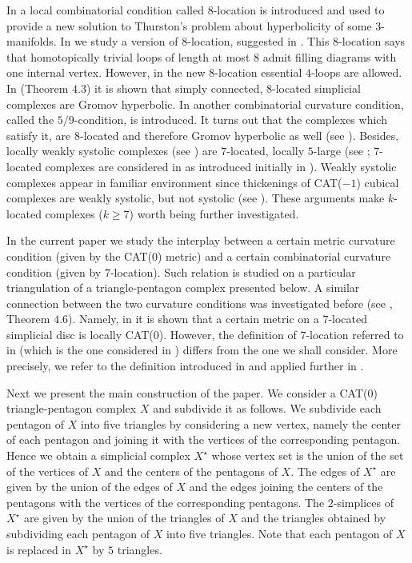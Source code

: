 \documentclass{amsart}
\theoremstyle{definition}
\theoremstyle{remark}
\numberwithin{equation}{section}
\begin{document}
In \cite{O-8loc} a local combinatorial condition called $8$-location is introduced and used to provide a new solution to Thurston's
problem about hyperbolicity of some $3$-manifolds. In \cite{L-8loc} we study a version of $8$-location, suggested in \cite[Subsection 5.1]{O-8loc}.
This $8$-location says that homotopically trivial loops of length at most $8$ admit filling diagrams with one internal vertex.
However, in the new $8$-location essential $4$-loops are allowed.
In \cite{L-8loc} (Theorem $4.3$) it is shown that simply connected,
$8$-located simplicial complexes are Gromov hyperbolic. 
In \cite{L-8loc2} another combinatorial curvature condition, called the $5/9$-condition, is introduced. It turns out that the complexes which satisfy
it, are $8$-located and therefore Gromov hyperbolic as well (see \cite{L-8loc2}). Besides, locally weakly systolic complexes (see \cite{O-sdn}) are $7$-located, locally $5$-large (see \cite{HL}; $7$-located complexes are considered in \cite{HL} as introduced initially in \cite{O-8loc}). Weakly systolic complexes appear in familiar environment since thickenings of CAT($-1$) cubical complexes are weakly systolic, but not
systolic (see \cite{O-sdn}). These arguments make $k$-located complexes ($k \geq 7$) worth being further investigated.

In the current paper we study the interplay between a certain metric curvature condition (given by the CAT(0) metric) and a certain combinatorial curvature condition (given by $7$-location). Such relation is studied on a particular triangulation of a triangle-pentagon complex presented below. A similar connection between the two curvature conditions was investigated before (see \cite{HL}, Theorem $4.6$). Namely, in \cite{HL} it is shown that a certain metric on a $7$-located simplicial disc is locally CAT(0). However, the definition of $7$-location referred to in \cite{HL} (which is the one considered in \cite{O-8loc}) differs from the one we shall consider. More precisely, we refer to the definition introduced in \cite{O-8loc} and applied further in \cite{L-8loc}. 

Next we present the main construction of the paper. We consider a CAT(0) triangle-pentagon complex $X$ and subdivide it as follows. We subdivide each pentagon of $X$ into five triangles by considering a new vertex, namely the center of each pentagon and joining it with the vertices of the corresponding pentagon. Hence we obtain a simplicial complex $X^{\star}$ whose vertex set is the union of the set of the vertices of $X$ and the centers of the pentagons of $X$. The edges of $X^{\star}$ are given by the union of the edges of $X$ and the edges joining the centers of the pentagons with the vertices of the corresponding pentagons. The $2$-simplices of $X^{\star}$ are given by the union of the triangles of $X$ and the triangles obtained by subdividing each pentagon of $X$ into five triangles. Note that each pentagon of $X$ is replaced in $X^{\star}$ by $5$ triangles.
\end{document}
